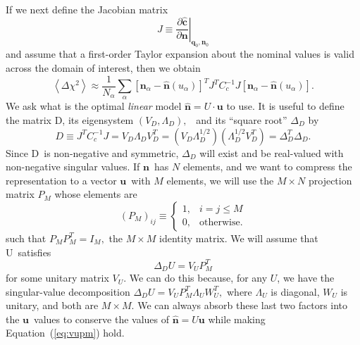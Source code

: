 \documentclass[linenumbers, onecolumn]{aastex63}
\newcommand{\eqq}[1]{Equation~(\ref{#1})}
\newcommand{\vecq}{\ensuremath{\mathbf{q}}}
\newcommand{\vecn}{\ensuremath{\mathbf{n}}}
\newcommand{\vecu}{\ensuremath{\mathbf{u}}}
\newcommand{\hatc}{\ensuremath{\hat{\mathbf{c}}}}
\newcommand{\covm}{C}
\newcommand{\matD}{D}
\newcommand{\matU}{U}
\newcommand{\matV}{V}
\newcommand{\proj}{P}  %
\newcommand{\jac}{J}   %
\newcommand{\ident}{I}  %
\newcommand{\DD}{\Delta_D}
\begin{document}
If we next define the Jacobian matrix
\begin{equation}
  \jac \equiv \left.\frac{\partial\hatc}{\partial\vecn}\right|_{\vecq_0, \vecn_0}
\label{eq:jacobian}
\end{equation}
and assume that a first-order Taylor expansion about the nominal values is valid across the domain of interest, then we obtain
\begin{equation}
  \left\langle \Delta\chi^2 \right\rangle \approx \frac{1}{N_\alpha} \sum_\alpha
  \left[ \vecn_\alpha - \hat{\vecn}(u_\alpha)\right]^T \jac^T \covm_c^{-1} \jac
  \left[ \vecn_\alpha - \hat{\vecn}(u_\alpha)\right].
  \label{eq:linearized}
\end{equation}
We ask what is the optimal \emph{linear} model $\hat{\vecn} = \matU \cdot \vecu$ to use.
It is useful to define the matrix \matD, its eigensystem
$(\matV_D,\Lambda_D),$  \ and its ``square root'' $\DD$ by
\begin{equation}
   \matD \equiv \jac^T \covm_c^{-1} \jac =  \matV_D \Lambda_D
   \matV_D^T = \left(\matV_D \Lambda_D^{1/2}\right)
   \left(\Lambda_D^{1/2}\matV_D^T \right) = \DD^T \DD.
 \end{equation}
Since \matD\ is non-negative and symmetric, $\DD$ will exist and be
real-valued with non-negative singular values.
If \vecn\ has $N$ elements, and we want to compress the representation
to a vector \vecu\ with $M$ elements, we will use the $M\times N$ projection
matrix $\proj_M$ whose elements are
\begin{equation}
  \left(\proj_M\right)_{ij} \equiv
\begin{cases}
                                            1,  &  i=j\le M \\
                                            0,  & \text{otherwise.}
\end{cases}
\end{equation}
such that $\proj_M \proj_M^T=\ident_M,$ the $M\times M$ identity
matrix. We will assume that \matU\ satisfies
\begin{equation}
  \DD \matU = \matV_U \proj_M^T
\label{eq:vupm}
\end{equation}
for some unitary matrix $\matV_U$.  We can do this because, for any $\matU$, we have the
singular-value decomposition $\DD \matU = \matV_U P_M^T \Lambda_U
W_U^T,$ where $\Lambda_U$ is diagonal, $W_U$ is unitary, and both are
$M\times M$.  We can always absorb these last two factors into the \vecu\ values
to conserve the values of $\hat{\vecn} = \matU \vecu$ while making
\eqq{eq:vupm} hold.
\end{document}
